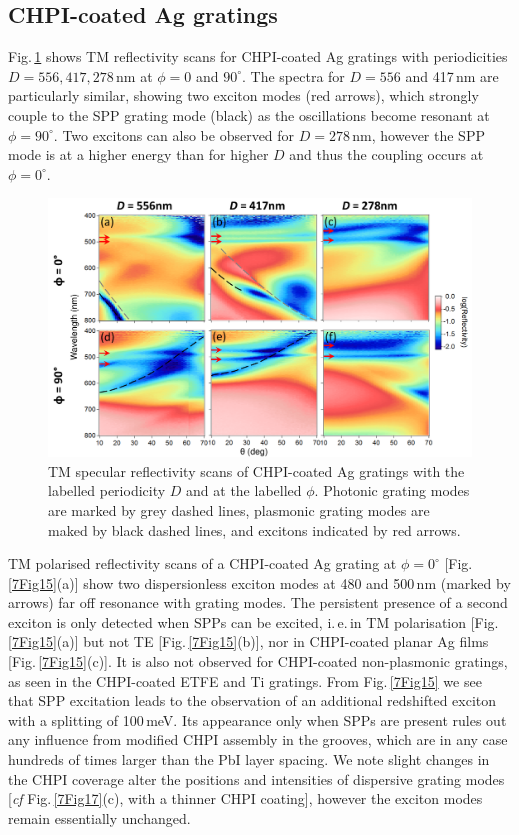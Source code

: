\subsection{CHPI-coated Ag gratings}
Fig.\,\ref{7Fig14} shows TM reflectivity scans for CHPI-coated Ag gratings with periodicities $D=556, 417, 278$\,nm at $\phi=0$ and $90^{\circ}$. The spectra for $D=556$ and 417\,nm are particularly similar, showing two exciton modes (red arrows), which strongly couple to the SPP grating mode (black) as the oscillations become resonant at $\phi=90^{\circ}$. Two excitons can also be observed for $D=278$\,nm, however the SPP mode is at a higher energy than for higher $D$ and thus the coupling occurs at $\phi=0^{\circ}$.
\begin{figure}[ht] 
\centering    
\includegraphics[width=\textwidth]{Fig14}
\caption{TM specular reflectivity scans of CHPI-coated Ag gratings with the labelled periodicity $D$ and at the labelled $\phi$. Photonic grating modes are marked by grey dashed lines, plasmonic grating modes are maked by black dashed lines, and excitons indicated by red arrows.}
\label{7Fig14}
\end{figure}

TM polarised reflectivity scans of a CHPI-coated Ag grating at $\phi=0^{\circ}$ [Fig.\,\ref{7Fig15}(a)] show two dispersionless exciton modes at 480 and 500\,nm (marked by arrows) far off resonance with grating modes. The persistent presence of a second exciton is only detected when SPPs can be excited, i.\,e.\,in TM polarisation [Fig.\,\ref{7Fig15}(a)] but not TE [Fig.\,\ref{7Fig15}(b)], nor in CHPI-coated planar Ag films [Fig.\,\ref{7Fig15}(c)]. It is also not observed for CHPI-coated non-plasmonic gratings, as seen in the CHPI-coated ETFE and Ti gratings. From Fig.\,\ref{7Fig15} we see that SPP excitation leads to the observation of an additional redshifted exciton with a splitting of 100\,meV. Its appearance only when SPPs are present rules out any influence from modified CHPI assembly in the grooves, which are in any case hundreds of times larger than the PbI layer spacing. We note slight changes in the CHPI coverage alter the positions and intensities of dispersive grating modes [{\it cf} Fig.\,\ref{7Fig17}(c), with a thinner CHPI coating], however the exciton modes remain essentially unchanged.

